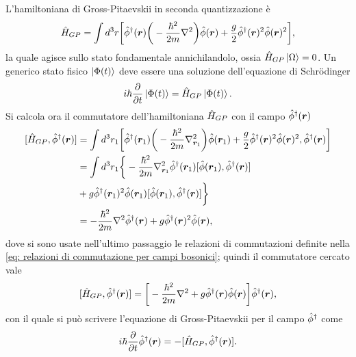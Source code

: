 L'hamiltoniana di Gross-Pitaevskii in seconda quantizzazione è
\begin{equation}
    \hat{H}_{GP} = \int d^3r\bigg[\hat{\phi}^\dagger(\bm{r})\bigg(-\frac{\hbar^2}{2m}\nabla^2\bigg)\hat{\phi}(\bm{r}) + \frac{g}{2}\hat{\phi}^\dagger(\bm{r})^2\hat{\phi}(\bm{r})^2\bigg],
\end{equation}
la quale agisce sullo stato fondamentale annichilandolo, ossia $\hat{H}_{GP}\ket{\Omega} = 0$. Un generico stato fisico $\ket{\Phi(t)}$ deve essere una soluzione dell'equazione di Schr\"odinger 
\begin{equation}
    i\hbar\frac{\partial}{\partial t}\ket{\Phi(t)} = \hat{H}_{GP}\ket{\Phi(t)}.
\end{equation}
Si calcola ora il commutatore dell'hamiltoniana $\hat{H}_{GP}$ con il campo $\hat{\phi}^\dagger(\bm{r})$
\begin{equation}
    \begin{split}
        [\hat{H}_{GP},\hat{\phi}^\dagger(\bm{r})] &= \int d^3r_1\bigg[\hat{\phi}^\dagger(\bm{r}_1)\bigg(-\frac{\hbar^2}{2m}\nabla^2_{\bm{r}_1}\bigg)\hat{\phi}(\bm{r}_1) + \frac{g}{2}\hat{\phi}^\dagger(\bm{r})^2\hat{\phi}(\bm{r})^2,\hat{\phi}^\dagger(\bm{r})\bigg] \\
        &= \int d^3r_1\bigg\{-\frac{\hbar^2}{2m}\nabla^2_{\bm{r}_1}\hat{\phi}^\dagger(\bm{r}_1)[\hat{\phi}(\bm{r}_1),\hat{\phi}^\dagger(\bm{r})] \\
        &+ g\hat{\phi}^\dagger(\bm{r}_1)^2\hat{\phi}(\bm{r}_1)[\hat{\phi}(\bm{r}_1),\hat{\phi}^\dagger(\bm{r})]\bigg\} \\
        &= -\frac{\hbar^2}{2m}\nabla^2\hat{\phi}^\dagger(\bm{r}) + g\hat{\phi}^\dagger(\bm{r})^2\hat{\phi}(\bm{r}),
    \end{split}
\end{equation}
dove si sono usate nell'ultimo passaggio le relazioni di commutazioni definite nella \eqref{eq: relazioni di commutazione per campi bosonici}; quindi il commutatore cercato vale
\begin{equation}
\label{eq: commutatore H_GP e phiT}
    [\hat{H}_{GP},\hat{\phi}^\dagger(\bm{r})] = \bigg[-\frac{\hbar^2}{2m}\nabla^2 + g\hat{\phi}^\dagger(\bm{r})\hat{\phi}(\bm{r})\bigg]\hat{\phi}^\dagger(\bm{r}),
\end{equation}
con il quale si può scrivere l'equazione di Gross-Pitaevskii per il campo $\hat{\phi}^\dagger$ come
\begin{equation}
\label{eq: equazione di Gross-Pitaevskii per campo phiT}
    i\hbar\frac{\partial}{\partial t}\hat{\phi}^\dagger(\bm{r}) = -[\hat{H}_{GP},\hat{\phi}^\dagger(\bm{r})].
\end{equation}


